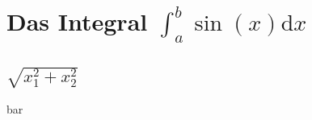 \documentclass[a5paper]{ttctexa}
\begin{document}
\tableofcontents
\section{Das \texorpdfstring{Integral $ \int_a^b \sin(x)\mathrm{d}x $}{Sinus-Integral}}
\subsection{\texorpdfstring{$\sqrt{x_1^2+x_2^2}$}{sqrt(x\_1\^{}2+x\_2\^{}2)}}
bar
\end{document}
